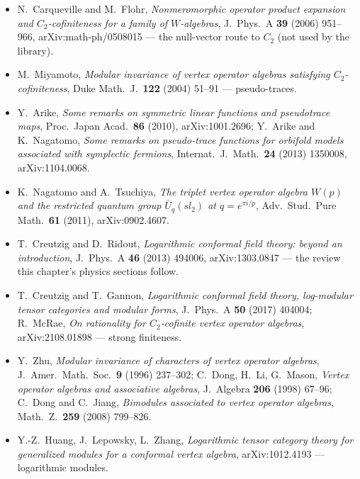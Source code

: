 \begin{itemize}
{  irreducible modules of certain subalgebras of free boson vertex algebra}, J.\ Algebra \textbf{270} (2003) 115--132.
\item N.~Carqueville and M.~Flohr, \emph{Nonmeromorphic operator product expansion and $C_2$-cofiniteness for a family of
  $W$-algebras}, J.\ Phys.\ A \textbf{39} (2006) 951--966, arXiv:math-ph/0508015 --- the null-vector route to $C_2$ (not
  used by the library).
\item M.~Miyamoto, \emph{Modular invariance of vertex operator algebras satisfying $C_2$-cofiniteness}, Duke Math.\ J.\
  \textbf{122} (2004) 51--91 --- pseudo-traces.
\item Y.~Arike, \emph{Some remarks on symmetric linear functions and pseudotrace maps}, Proc.\ Japan Acad.\ \textbf{86}
  (2010), arXiv:1001.2696; Y.~Arike and K.~Nagatomo, \emph{Some remarks on pseudo-trace functions for orbifold models
  associated with symplectic fermions}, Internat.\ J.\ Math.\ \textbf{24} (2013) 1350008, arXiv:1104.0068.
\item K.~Nagatomo and A.~Tsuchiya, \emph{The triplet vertex operator algebra $W(p)$ and the restricted quantum group
  $\bar U_q(sl_2)$ at $q=e^{\pi i/p}$}, Adv.\ Stud.\ Pure Math.\ \textbf{61} (2011), arXiv:0902.4607.
\item T.~Creutzig and D.~Ridout, \emph{Logarithmic conformal field theory: beyond an introduction}, J.\ Phys.\ A
  \textbf{46} (2013) 494006, arXiv:1303.0847 --- the review this chapter's physics sections follow.
\item T.~Creutzig and T.~Gannon, \emph{Logarithmic conformal field theory, log-modular tensor categories and modular forms},
  J.\ Phys.\ A \textbf{50} (2017) 404004; R.~McRae, \emph{On rationality for $C_2$-cofinite vertex operator algebras},
  arXiv:2108.01898 --- strong finiteness.
\item Y.~Zhu, \emph{Modular invariance of characters of vertex operator algebras}, J.\ Amer.\ Math.\ Soc.\ \textbf{9}
  (1996) 237--302; C.~Dong, H.~Li, G.~Mason, \emph{Vertex operator algebras and associative algebras}, J.\ Algebra
  \textbf{206} (1998) 67--96; C.~Dong and C.~Jiang, \emph{Bimodules associated to vertex operator algebras}, Math.\ Z.\
  \textbf{259} (2008) 799--826.
\item Y.-Z.~Huang, J.~Lepowsky, L.~Zhang, \emph{Logarithmic tensor category theory for generalized modules for a conformal
  vertex algebra}, arXiv:1012.4193 --- logarithmic modules.
\end{itemize}

\endgroup
